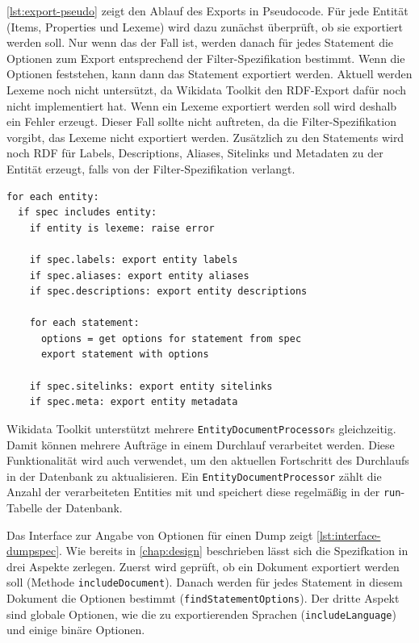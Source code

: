 \cref{lst:export-pseudo} zeigt den Ablauf des Exports in Pseudocode.
Für jede Entität (Items, Properties und Lexeme) wird dazu zunächst überprüft, ob sie exportiert werden soll.
Nur wenn das der Fall ist, werden danach für jedes Statement die Optionen zum Export entsprechend der Filter-Spezifikation bestimmt. 
Wenn die Optionen feststehen, kann dann das Statement exportiert werden.
Aktuell werden Lexeme noch nicht untersützt, da Wikidata Toolkit den RDF-Export dafür noch nicht implementiert hat.
Wenn ein Lexeme exportiert werden soll wird deshalb ein Fehler erzeugt.
Dieser Fall sollte nicht auftreten, da die Filter-Spezifikation vorgibt, das Lexeme nicht exportiert werden.
Zusätzlich zu den Statements wird noch RDF für Labels, Descriptions, Aliases, Sitelinks und Metadaten zu der Entität erzeugt, falls von der Filter-Spezifikation verlangt.

\begin{lstlisting}[keywords={for,each,if,let}, caption={Pseudocode für Entity-Export}, label={lst:export-pseudo}]
for each entity:
  if spec includes entity:
    if entity is lexeme: raise error
  
    if spec.labels: export entity labels
    if spec.aliases: export entity aliases
    if spec.descriptions: export entity descriptions

    for each statement:
      options = get options for statement from spec
      export statement with options

    if spec.sitelinks: export entity sitelinks
    if spec.meta: export entity metadata
\end{lstlisting}

Wikidata Toolkit unterstützt mehrere \verb|EntityDocumentProcessor|s gleichzeitig.
Damit können mehrere Aufträge in einem Durchlauf verarbeitet werden. 
Diese Funktionalität wird auch verwendet, um den aktuellen Fortschritt des Durchlaufs in der Datenbank zu aktualisieren.
Ein \verb|EntityDocumentProcessor| zählt die Anzahl der verarbeiteten Entities mit und speichert diese regelmäßig in der \verb|run|-Tabelle der Datenbank.

Das Interface zur Angabe von Optionen für einen Dump zeigt \cref{lst:interface-dumpspec}.
Wie bereits in \cref{chap:design} beschrieben lässt sich die Spezifkation in drei Aspekte zerlegen.
Zuerst wird geprüft, ob ein Dokument exportiert werden soll (Methode \verb|includeDocument|).
Danach werden für jedes Statement in diesem Dokument die Optionen bestimmt (\verb|findStatementOptions|).
Der dritte Aspekt sind globale Optionen, wie die zu exportierenden Sprachen (\verb|includeLanguage|) und einige binäre Optionen.

